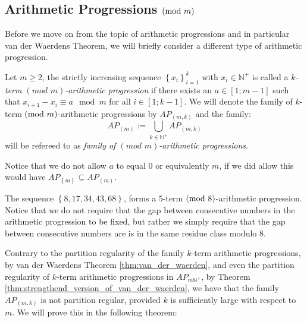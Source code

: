 \subsection{Arithmetic Progressions $(\textnormal{mod } m)$}
Before we move on from the topic of arithmetic progressions and in particular van der Waerdens Theorem, we will briefly consider a different type of arithmetic progression.

\begin{definition}
	Let $m \geq 2$, the strictly increasing sequence $\left\{x_i\right\}_{i = 1}^k$ with $x_i \in \mathbb{N}^{+}$ is called a \textit{$k$-term $(\textit{mod } m)$-arithmetic progression} if there exists an $a \in [1; m - 1]$ such that $x_{i + 1} - x_{i} \equiv a \mod m$ for all $i \in [1; k - 1]$. We will denote the family of $k$-term $(\textnormal{mod } m)$-arithmetic progressions by $AP_{(m, k)}$ and the family:
	\begin{equation*}
		AP_{(m)} := \bigcup_{k \in \mathbb{N}^{+}} AP_{(m, k)}
	\end{equation*}
	will be refereed to as \textit{family of $(\textit{mod } m)$-arithmetic progressions}.
\end{definition}
\begin{remark}
	Notice that we do not allow $a$ to equal $0$ or equivalently $m$, if we did allow this would have $AP_{\left\{m\right\}} \subseteq AP_{(m)}$.
\end{remark}

\begin{example}\label{exmp:mod_arithmetic_progression}
	The sequence $\left\{8, 17, 34, 43, 68\right\}$, forms a $5$-term $(\textnormal{mod } 8)$-arithmetic progression. Notice that we do not require that the gap between consecutive numbers in the arithmetic progression to be fixed, but rather we simply require that the gap between consecutive numbers are is in the same residue class modulo $8$.
\end{example}

Contrary to the partition regularity of the family $k$-term arithmetic progressions, by van der Waerdens Theorem \ref{thm:van_der_waerden}, and even the partition regularity of $k$-term arithmetic progressions in $AP_{m\mathbb{N}^{+}}$, by Theorem \ref{thm:strengthend_version_of_van_der_waerden}, we have that the family $AP_{(m, k)}$ is not partition regular, provided $k$ is sufficiently large with respect to $m$. We will prove this in the following theorem:

